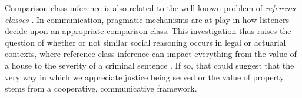 \documentclass[doc, floatsintext]{apa6}
\newcommand{\ndg}[1]{\textcolor{Green}{[ndg: #1]}}
\newcommand{\mht}[1]{\textcolor{Blue}{[mht: #1]}}
\begin{document}
Comparison class inference is also related to the well-known problem of \emph{reference classes} \cite{Reichenbach1949, hajek2007reference}. In communication, pragmatic mechanisms are at play in how listeners decide upon an appropriate comparison class. This investigation thus raises the question of whether or not similar social reasoning occurs in legal or actuarial contexts, where reference class inference can impact everything from the value of a house to the severity of a criminal sentence \cite{colyvan2001crime, cheng2009practical}. 
If so, that could suggest that the very way in which we appreciate justice being served or the value of property stems from a cooperative, communicative framework. 






\end{document}
